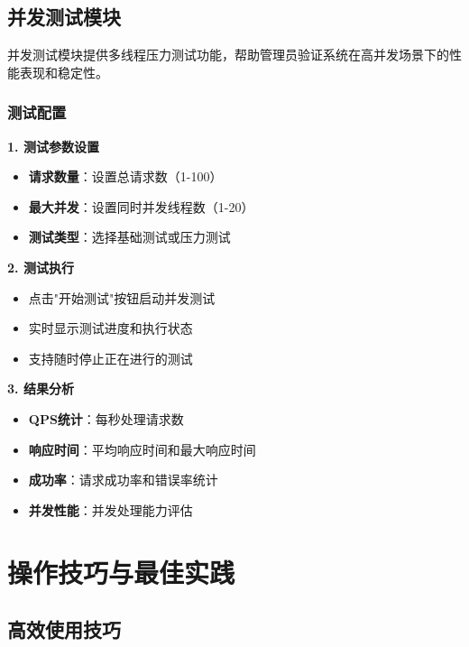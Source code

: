 \documentclass[12pt, a4paper]{article}
\begin{document}
\subsection{并发测试模块}

\begin{infobox}[title={性能压力测试}]
并发测试模块提供多线程压力测试功能，帮助管理员验证系统在高并发场景下的性能表现和稳定性。
\end{infobox}

\subsubsection{测试配置}

\textbf{1. 测试参数设置}
\begin{itemize}
    \item \textbf{请求数量}：设置总请求数（1-100）
    \item \textbf{最大并发}：设置同时并发线程数（1-20）
    \item \textbf{测试类型}：选择基础测试或压力测试
\end{itemize}

\textbf{2. 测试执行}
\begin{itemize}
    \item 点击"开始测试"按钮启动并发测试
    \item 实时显示测试进度和执行状态
    \item 支持随时停止正在进行的测试
\end{itemize}

\textbf{3. 结果分析}
\begin{itemize}
    \item \textbf{QPS统计}：每秒处理请求数
    \item \textbf{响应时间}：平均响应时间和最大响应时间
    \item \textbf{成功率}：请求成功率和错误率统计
    \item \textbf{并发性能}：并发处理能力评估
\end{itemize}

\section{操作技巧与最佳实践}

\subsection{高效使用技巧}
\end{document}
